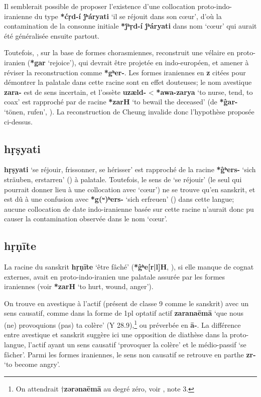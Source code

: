 \documentclass{article}
\newcommand{\ipa}[1]{{\phon\textbf{#1}}}
\begin{document}
Il semblerait possible de proposer l'existence d'une collocation proto-indo-iranienne du type \ipa{*ćṛd-í j́ʰáryati} `il se réjouit dans son cœur', d'où la contamination de la consonne initiale \ipa{*j́ʰṛd-í j́ʰáryati} dans nom `cœur' qui aurait été généralisée ensuite partout.

Toutefois, \citet[104]{cheung07dictionary}, sur la base de formes chorasmiennes, reconstruit une vélaire en proto-iranien (\ipa{*gar} `rejoice'), qui devrait être projetée en indo-européen, et amener à réviser la reconstruction comme \ipa{*gʰer-}. Les formes iraniennes en \ipa{z} citées pour démontrer la palatale dans cette racine sont en effet douteuses; le nom avestique \ipa{zara-} est de sens incertain, et l'ossète \ipa{uzæld-} < \ipa{*awa-zarya} `to nurse, tend, to coax' est rapproché par  \citet[470]{cheung07dictionary} de racine \ipa{*zarH} `to bewail the deceased' (de \ipa{*ĝar-} `tönen, rufen', \citealt[161]{liv}). La reconstruction de Cheung invalide donc l'hypothèse proposée ci-dessus.

\subsection{\ipa{hṛṣyati}}
\ipa{hṛṣyati} `se réjouir, frissonner, se hérisser' est rapproché de la racine \ipa{*ĝʰers-} `sich sträuben, erstarren' (\citealt[178]{liv}) à palatale. Toutefois,  le sens de `se réjouir' (le seul qui pourrait donner lieu à une collocation avec `cœur') ne se trouve qu'en sanskrit, et est dû à une confusion avec \ipa{*g(ʷ)ʰers-} `sich erfreuen' (\citealt[198]{liv}) dans cette langue; aucune collocation de date indo-iranienne basée sur cette racine n'aurait donc pu causer la contamination observée dans le nom `cœur'.


\subsection{\ipa{hṛṇīte}}
La racine du sanskrit \ipa{hṛṇīte} `être fâché' (\ipa{*ĝʰe[r|l]H}, \citealt[178]{liv}), si elle manque de cognat externes, avait en proto-indo-iranien une palatale assurée par les formes iraniennes (voir \citealt[469]{cheung07dictionary} \ipa{*zarH} ‘to hurt, wound, anger’). 

On trouve en avestique à l'actif (présent de classe 9 comme le sanskrit) avec un sens causatif, comme dans la forme de 1pl optatif actif \ipa{zaranaēmā} `que nous (ne) provoquions (pas) ta colère' (Y 28.9),\footnote{On attendrait $\dagger$\ipa{zərənaēmā} au degré zéro, voir \citet[178]{liv}, note 3.  } ou préverbée en \ipa{ā-}. La différence entre avestique et sanskrit suggère ici une opposition de diathèse dans la proto-langue, l'actif ayant un sens causatif `provoquer la colère' et le médio-passif `se fâcher'. Parmi les formes iraniennes, le sens non causatif se retrouve en parthe \ipa{zr-} `to become angry'.
\end{document}
